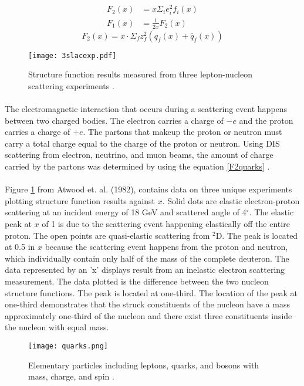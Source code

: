 \begin{align}
		F_2(x) &= x \Sigma_i e^2_i f_i(x) \label{F2pd}\\ 
		F_1(x) &= \frac{1}{2x} F_2(x) \label{CGr} 
\end{align}
\begin{equation}
		F_2(x) = x \cdot \Sigma_f z^2_f ( q_f(x) + \bar{q}_f(x)) \label{F2quarks} 
\end{equation}
\begin{figure}[t]
	\centering
	\texttt{[image: 3slacexp.pdf]} 
	\caption{ Structure function results measured from three lepton-nucleon scattering experiments \cite{Atwood}.}
	\label{3leps}
\end{figure}
\paragraph{}The electromagnetic interaction that occurs during a scattering event happens between two charged bodies. The electron carries a charge of $- e$ and the proton carries a charge of $+e$. The partons that makeup the proton or neutron must carry a total charge equal to the charge of the proton or neutron. Using DIS scattering from electron, neutrino, and muon beams, the amount of charge carried by the partons was determined by using the equation \ref{F2quarks} \cite{PnN,DISquark,callan}. 

\paragraph{}Figure \ref{3leps} from Atwood et. al. (1982), contains data on three unique experiments plotting structure function results against $x$. Solid dots are elastic electron-proton scattering at an incident energy of 18 GeV and scattered angle of 4$^\circ$. The elastic peak at $x$ of 1 is due to the scattering event happening elastically off the entire proton. The open points are quasi-elastic scattering from $^2$D. The peak is located at 0.5 in $x$ because the scattering event happens from the proton and neutron, which individually contain only half of the mass of the complete deuteron. The data represented by an 'x' displays result from an inelastic electron scattering measurement. The data plotted is the difference between the two nucleon structure functions. The peak is located at one-third. The location of the peak at one-third demonstrates that the struck constituents of the nucleon have a mass approximately one-third of the nucleon and there exist three constituents inside the nucleon with equal mass\cite{Atwood,PnN}.
\begin{figure}[t]
	\centering
	\texttt{[image: quarks.png]} 
	\caption{ Elementary particles including leptons, quarks, and bosons with mass, charge, and spin \cite{sane}.}
	\label{fig:quarks}
\end{figure} 
